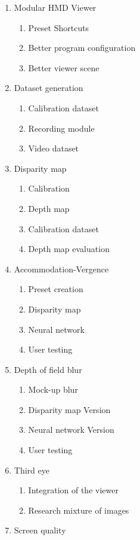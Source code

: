 \documentclass[10pt,a4paper,twocolumn,twoside]{article}
\begin{document}
	\begin{enumerate}
		\item \label{obj:viewer} Modular HMD Viewer 
		\begin{enumerate}
			\item Preset Shortcuts
			\item Better program configuration
			\item Better viewer scene
		\end{enumerate}
	
		\item Dataset generation
		\begin{enumerate}
			\item Calibration dataset
			\item \label{obj:dataset:record} Recording module
			\item \label{obj:dataset:video} Video dataset
		\end{enumerate}
	
		\item \label{obj:dispmap} Disparity map
		\begin{enumerate}
			\item Calibration
			\item Depth map
			\item Calibration dataset
			\item \label{obj:dispmap:eval} Depth map evaluation
		\end{enumerate}
	
		\item \label{obj:acc} Accommodation-Vergence
		\begin{enumerate}
			\item \label{obj:acc:preset} Preset creation
			\item \label{obj:acc:dispmap} Disparity map
			\item \label{obj:acc:nn} Neural network
			\item User testing
		\end{enumerate}
	
		\item Depth of field blur
		\begin{enumerate}
			\item Mock-up blur
			\item Disparity map Version
			\item Neural network Version
			\item User testing
		\end{enumerate}
	
		\item \label{obj:third} Third eye
		\begin{enumerate}
			\item Integration of the viewer
			\item Research mixture of images
		\end{enumerate}
	
		\item Screen quality
	\end{enumerate}
\end{document}
